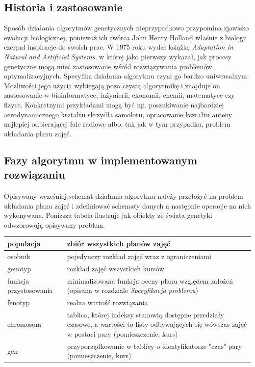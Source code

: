 \subsection{Historia i zastosowanie}
Sposób działania algorytmów genetycznych nieprzypadkowo przypomina zjawisko ewolucji biologicznej, ponieważ ich twórca John Henry Holland właśnie z biologii czerpał inspiracje do swoich prac\cite{Mitchell}. W 1975 roku wydał książkę \emph{Adaptation in Natural and Artificial Systems}, w której jako pierwszy wykazał, jak procesy genetyczne mogą mieć zastosowanie wśród rozwiązywania problemów optymalizacyjnych. Specyfika działania algorytmu czyni go bardzo uniwersalnym. Możliwości jego użycia wybiegają poza czystą algorytmikę i znajduje on zastosowanie w bioinformatyce, inżynierii, ekonomii, chemii, matematyce czy fizyce. Konkretnymi przykładami mogą być np. poszukiwanie najbardziej aerodynamicznego kształtu skrzydła samolotu, opracowanie kształtu anteny najlepiej odbierającej fale radiowe albo, tak jak w tym przypadku, problem układania planu zajęć.
\subsection{Fazy algorytmu w implementowanym rozwiązaniu}
\paragraph{}Opisywany wcześniej schemat działania algorytmu należy przełożyć na problem układania planu zajęć i zdefiniować schematy danych a następnie operacje na nich wykonywane. Poniższa tabela ilustruje jak obiekty ze świata genetyki odwzorowują opisywany problem.
\begin{center}
\begin{tabular}{| l | p{10cm} |}
\hline
populacja & zbiór wszystkich planów zajęć \\ \hline
osobnik & pojedynczy rozkład zajęć wraz z ograniczeniami \\ \hline
genotyp & rozkład zajęć wszystkich kursów \\ \hline
funkcja przystosowania & minimalizowana funkcja oceny planu względem założeń (opisana w rozdziale \emph{Specyfikacja problemu}) \\ \hline
fenotyp & realna wartość rozwiązania \\ \hline
chromosom & tablica, której indeksy stanowią dostępne przedziały czasowe, a wartości to listy odbywających się wówczas zajęć w postaci pary (pomieszczenie, kurs) \\ \hline
gen & przyporządkowanie w tablicy o identyfikatorze "czas" pary  (pomieszczenie, kurs) \\ \hline
\end{tabular}
\end{center}
